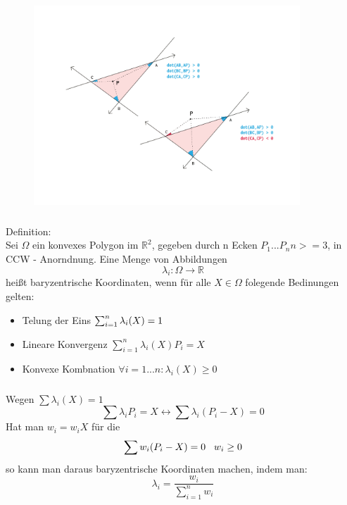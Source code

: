 \documentclass{beamer}
\begin{document}
\begin{frame}
	\frametitle{}	
	\begin{figure}
		\centering
		\includegraphics[width=10cm]{bilder/points-.png} 
	\end{figure}
\end{frame}

\begin{frame}
	\frametitle{\phantom{}}
	\small 
	Definition: \\
	Sei $\Omega$ ein konvexes Polygon im \(\mathbb{R}^2\), gegeben durch n Ecken $P_{1}...P_{n} n >= 3$, in CCW - Anorndnung. Eine Menge von Abbildungen  \[\lambda_{i}: \Omega \longrightarrow \mathbb{R}\] heißt baryzentrische
	Koordinaten, wenn für alle $X \in \Omega$ folegende Bedinungen gelten:
	\begin{itemize}
	\item Telung der Eins $\sum_{i=1}^{n} \lambda_{i}(X)= 1 \hspace{3mm}$
	\item Lineare Konvergenz $\sum_{i=1}^{n} \lambda_{i}(X)P_{i}= X$
	\item Konvexe Kombnation $\forall i=1...n: \lambda_{i}(X) \geq 0$
	\end{itemize}
\end{frame}
	
\begin{frame}
	\frametitle{\phantom{}}
	Wegen $\sum \lambda_{i}(X)= 1$ 
	\[\sum \lambda_{i}P_{i} = X \leftrightarrow \sum \lambda_{i}(P_{i} - X) = 0 \]
	Hat man $w_{i} = w_{i}X$ für die 
	\[\sum w_{i}(P_{i} - X) = 0 \hspace{3mm} w_{i} \geq 0\] 
	so kann  man daraus baryzentrische Koordinaten machen, indem man:
	\[\lambda_{i} = \frac{w_{i}}{\sum_{i=1}^{n} w_{i}}\] 
\end{frame}
\end{document}
